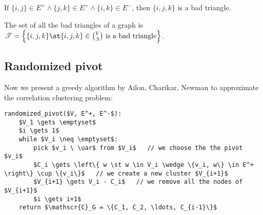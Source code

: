 \begin{defn}
    If $\{i,j\} \in E^+ \wedge \{j,k\} \in E^+ \wedge \{i,k\} \in E^-$, then $\{i,j,k\}$ is a bad triangle.
    
    The set of all the bad triangles of a graph is $\mathscr{T} = \left\{ \{i,j,k\} \st \{i,j,k\} \in \binom{V}{3} \text{ is a bad triangle} \right\}$.
\end{defn}


\subsection{Randomized pivot}\label{sec:random-pivot}

Now we present a greedy algorithm by Ailon, Charikar, Newman to approximate the correlation clustering problem:
\begin{lstlisting}[caption={Randomized Pivot}, label={lst:clust-random-pivot}]
randomized_pivot($V, E^+, E^-$):
    $V_1 \gets \emptyset$
    $i \gets 1$
    while $V_i \neq \emptyset$:
        pick $v_i \ \uar$ from $V_i$   // we choose the the pivot $v_i$
        $C_i \gets \left\{ w \st w \in V_i \wedge \{v_i, w\} \in E^+ \right\} \cup \{v_i\}$   // we create a new cluster $V_{i+1}$
        $V_{i+1} \gets V_i - C_i$   // we remove all the nodes of $V_{i+1}$
        $i \gets i+1$
    return $\mathscr{C}_G = \{C_1, C_2, \ldots, C_{i-1}\}$
\end{lstlisting}

